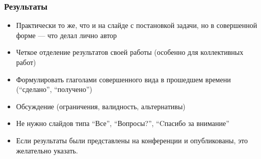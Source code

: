 \documentclass{beamer}
\begin{document}
\begin{frame}
  \transwipe[direction=90]
  \frametitle{Результаты}
  \begin{itemize}
    \item Практически то же, что и на слайде с постановкой задачи, но в совершенной форме --- что делал лично автор
    \item Четкое отделение результатов своей работы (особенно для коллективных работ)
    \item Формулировать глаголами совершенного вида в прошедшем времени (``сделано'', ``получено'')
    \item Обсуждение (ограничения, валидность, альтернативы)
    \item Не нужно слайдов типа ``Все'', ``Вопросы?'', ``Cпасибо за внимание''
  \end{itemize}

  \begin{itemize}
    \item Если результаты были представлены на конференции и опубликованы, это желательно указать. 
  \end{itemize}
\end{frame}
\end{document}
